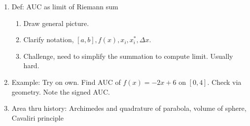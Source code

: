 \documentclass{article}
\begin{document}
\begin{enumerate}
\item Def: AUC as limit of Riemann sum
\begin{enumerate}
\item Draw general picture.
\item Clarify notation, $[a,b], f(x), x_i, x_i^*, \Delta x$.
\item Challenge, need to simplify the summation to compute limit. Usually hard.
\end{enumerate}

\item Example: Try on own. Find AUC of $f(x)=-2x+6$ on $[0,4]$. Check via geometry. Note the signed AUC.

\item Area thru history: Archimedes and quadrature of parabola, volume of sphere, Cavaliri principle

\end{enumerate}


\end{document}
